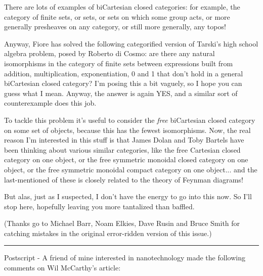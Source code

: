 There are lots of examples of biCartesian closed categories: for
example, the category of finite sets, or sets, or sets on which some
group acts, or more generally presheaves on any category, or still more
generally, any topos!  

Anyway, Fiore has solved the following categorified version of Tarski's
high school algebra problem, posed by Roberto di Cosmo: are there any
natural isomorphisms in the category of finite sets between expressions
built from addition, multiplication, exponentiation, 0 and 1 that don't
hold in a general biCartesian closed category?  I'm posing this a bit
vaguely, so I hope you can guess what I mean.  Anyway, the answer is
again YES, and a similar sort of counterexample does this job.

To tackle this problem it's useful to consider the \emph{free} biCartesian
closed category on some set of objects, because this has the fewest
isomorphisms.  Now, the real reason I'm interested in this stuff is that
James Dolan and Toby Bartels have been thinking about various similar
categories, like the free Cartesian closed category on one object, 
or the free symmetric monoidal closed category on one object, or the
free symmetric monoidal compact category on one object... and the
last-mentioned of these is closely related to the theory of Feynman 
diagrams!   

But alas, just as I suspected, I don't have the energy to go into this
now.  So I'll stop here, hopefully leaving you more tantalized than
baffled.

(Thanks go to Michael Barr, Noam Elkies, Dave Rusin and Bruce Smith for 
catching mistakes in the original error-ridden version of this issue.)

\par\noindent\rule{\textwidth}{0.4pt}

Postscript - A friend of mine interested in nanotechnology made the following
comments on Wil McCarthy's article:



